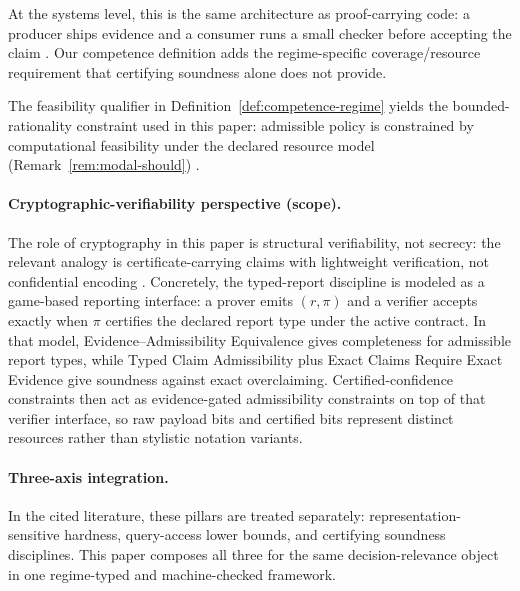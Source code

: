 At the systems level, this is the same architecture as proof-carrying code: a producer ships evidence and a consumer runs a small checker before accepting the claim \cite{necula1997proof,mcconnell2010certifying}. Our competence definition adds the regime-specific coverage/resource requirement that certifying soundness alone does not provide.

The feasibility qualifier in Definition~\ref{def:competence-regime} yields the bounded-rationality constraint used in this paper: admissible policy is constrained by computational feasibility under the declared resource model (Remark~\ref{rem:modal-should}) \cite{sep_bounded_rationality,arora2009computational}.

\paragraph{Cryptographic-verifiability perspective (scope).}
The role of cryptography in this paper is structural verifiability, not secrecy: the relevant analogy is certificate-carrying claims with lightweight verification, not confidential encoding \cite{goldwasser1989knowledge,necula1997proof}. Concretely, the typed-report discipline is modeled as a game-based reporting interface: a prover emits $(r,\pi)$ and a verifier accepts exactly when $\pi$ certifies the declared report type under the active contract. In that model, Evidence--Admissibility Equivalence gives completeness for admissible report types, while Typed Claim Admissibility plus Exact Claims Require Exact Evidence give soundness against exact overclaiming. Certified-confidence constraints then act as evidence-gated admissibility constraints on top of that verifier interface, so raw payload bits and certified bits represent distinct resources rather than stylistic notation variants.

\paragraph{Three-axis integration.}
In the cited literature, these pillars are treated separately: representation-sensitive hardness, query-access lower bounds, and certifying soundness disciplines. This paper composes all three for the same decision-relevance object in one regime-typed and machine-checked framework.
